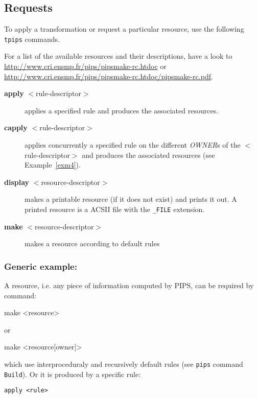 \documentclass[a4paper,12pt]{article}
\newcommand{\PipsPIPSmakePDF}{\url{http://www.cri.ensmp.fr/pips/pipsmake-rc.htdoc/pipsmake-rc.pdf}\xspace}
\newcommand{\PipsPIPSmakeHTDOC}{\url{http://www.cri.ensmp.fr/pips/pipsmake-rc.htdoc}\xspace}
\begin{document}
\subsection{Requests}

To apply a transformation or request a particular resource, use the
following \texttt{tpips} commands.

For a list of the available resources and their descriptions, have a look
to \PipsPIPSmakeHTDOC or \PipsPIPSmakePDF.

\begin{description}

\item[{\bf apply} $<$rule-descriptor$>$] applies a specified rule and
  produces the associated resources.

\item[{\bf capply} $<$rule-descriptor$>$] applies concurrently a specified
  rule on the different \emph{OWNER}s of the $<$rule-descriptor$>$ and
  produces the associated resources (see Example~\ref{exm4}).

\item[{\bf display} $<$resource-descriptor$>$] makes a printable resource
  (if it does not exist) and prints it out. A printed resource is a ACSII
  file with the \verb+_FILE+ extension.

\item[{\bf make} $<$resource-descriptor$>$] makes a resource according to
  default rules

\end{description}


\subsubsection*{Generic example:}

A resource, i.e. any piece of information computed by PIPS,
can be required by command:

{\bf
\begin{verbatim*}
make <resource>
\end{verbatim*}
}

or

{\bf
\begin{verbatim*}
make <resource[owner]>
\end{verbatim*}
}

which use interproceduraly and recursively default rules (see
\texttt{pips} command \texttt{Build}). Or it is produced by a specific
rule: {\bf
\begin{verbatim}
apply <rule>
\end{verbatim}
}
\end{document}
